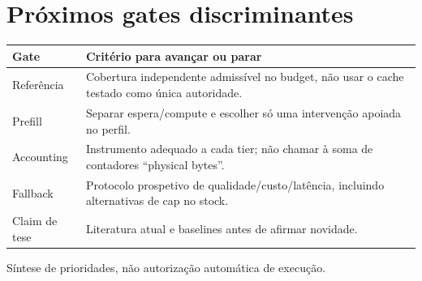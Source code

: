 \section{Próximos gates discriminantes}
\begin{tabularx}{\linewidth}{@{}p{30mm}Y@{}}
\toprule \textbf{Gate} & \textbf{Critério para avançar ou parar}\\ \midrule
Referência & Cobertura independente admissível no budget, não usar o cache testado como única autoridade.\\
Prefill & Separar espera/compute e escolher só uma intervenção apoiada no perfil.\\
Accounting & Instrumento adequado a cada tier; não chamar à soma de contadores “physical bytes”.\\
Fallback & Protocolo prospetivo de qualidade/custo/latência, incluindo alternativas de cap no stock.\\
Claim de tese & Literatura atual e baselines antes de afirmar novidade.\\
\bottomrule
\end{tabularx}
{\small Síntese de prioridades, não autorização automática de execução.   }
